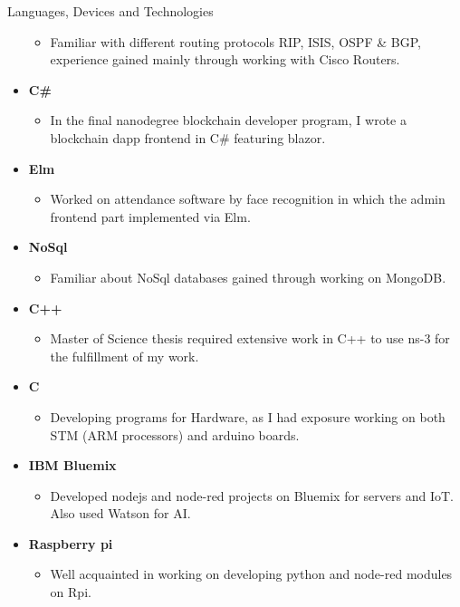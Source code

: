 \documentclass[]{mcdowellcv}
\begin{document}
\begin{cvsection}{Languages, Devices and Technologies}
\begin{cvsubsection}{}{}{}
\begin{itemize}
\begin{itemize}
					\item Familiar with different routing protocols RIP, ISIS, OSPF \& BGP, experience gained mainly through working with Cisco Routers.
				\end{itemize}
				\item \textbf{C\#}
				\begin{itemize}
					\item In the final nanodegree blockchain developer program, I wrote a blockchain dapp frontend in C\# featuring blazor.
				\end{itemize}
				\item \textbf{Elm}
				\begin{itemize}
					\item Worked on attendance software by face recognition in which the admin frontend part implemented via Elm.
				\end{itemize}
				\item \textbf{NoSql}
				\begin{itemize}
					\item Familiar about NoSql databases gained through working on MongoDB.
				\end{itemize}
				\item \textbf{C++}
				\begin{itemize}
					\item Master of Science thesis required extensive work in C++ to use ns-3 for the fulfillment of my work.
				\end{itemize}
				\item \textbf{C}
				\begin{itemize}
					\item Developing programs for Hardware, as I had exposure working on both STM (ARM processors) and arduino boards.
				\end{itemize}
				\item \textbf{IBM Bluemix}
				\begin{itemize}
					\item Developed nodejs and node-red projects on Bluemix for servers and IoT. Also used Watson for AI.
				\end{itemize}
				\item \textbf{Raspberry pi}
				\begin{itemize}
					\item Well acquainted in working on developing python and node-red modules on Rpi.
				\end{itemize}
				

\end{itemize}
\end{cvsubsection}
\end{cvsection}
\end{document}
